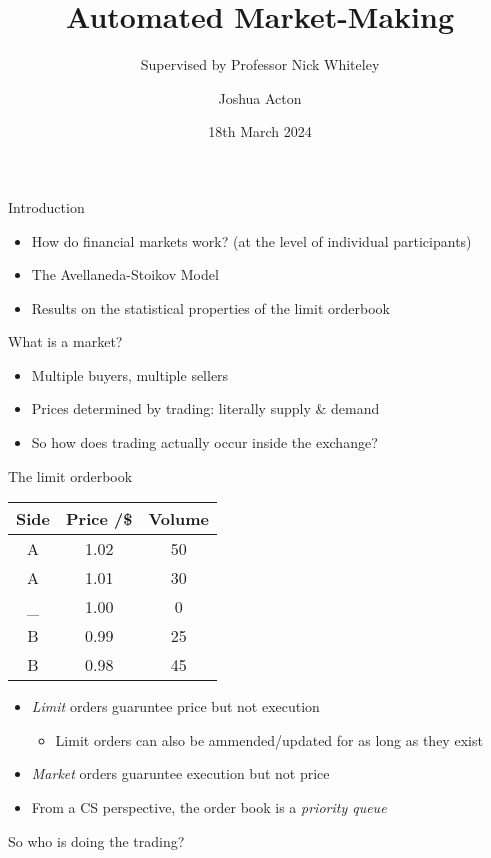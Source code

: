 \documentclass{beamer} %
\title{Automated Market-Making}
\author{Joshua Acton}
\date{18th March 2024}
\subtitle{Supervised by Professor Nick Whiteley}
\begin{document}
\begin{frame}
    \titlepage
\end{frame}

\begin{frame}{Introduction}
    \begin{itemize}
    \item How do financial markets work? (at the level of individual participants)
    \item The Avellaneda-Stoikov Model
    \item Results on the statistical properties of the limit orderbook
    \end{itemize}
\end{frame}

\begin{frame}{What is a market?}
    \begin{itemize}
        \item Multiple buyers, multiple sellers
        \item Prices determined by trading: literally supply \& demand
        \item So how does trading actually occur inside the exchange?
    \end{itemize}
\end{frame}

\begin{frame}{The limit orderbook}
    \begin{center}
        \begin{tabular}{ |c|c|c| } 
            \hline
            Side & Price /\$ & Volume \\ 
            \hline
            A & 1.02 & 50 \\
            A & 1.01 & 30 \\
            \_ & 1.00 & 0 \\
            B & 0.99 & 25 \\ 
            B & 0.98 & 45 \\
            \hline
        \end{tabular}
    \end{center}
    \begin{itemize}
        \item \emph{Limit} orders guaruntee price but not execution
        \begin{itemize}
            \item Limit orders can also be ammended/updated for as long as they exist
        \end{itemize}
        \item \emph{Market} orders guaruntee execution but not price
        \item From a CS perspective, the order book is a \emph{priority queue}
    \end{itemize}
    So who is doing the trading?
\end{frame}
\end{document}
